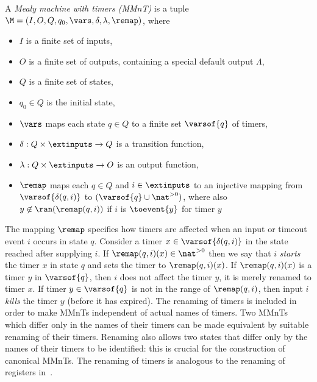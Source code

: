 \begin{definition}
\label{def:MMnT}
A \emph{Mealy machine with timers (MMnT)} is a tuple
\\
$\M = (I, O, Q, q_0, \vars, \delta, \lambda, \remap)$, where
\begin{itemize}
\item
  $I$ is a finite set of inputs,
\item
$O$ is a finite set of outputs, containing a special default output $\Lambda$,
\item
$Q$ is a finite set of states,
\item
$q_0 \in Q$ is the initial state,
\item
  $\vars$ maps each state $q \in Q$ to a finite set
$\varsof{q}$ of timers,
\item
$\delta: Q \times \extinputs \rightarrow Q$ is a transition function, 
\item
$\lambda: Q \times \extinputs \rightarrow O$ is an output function, 
\item
  $\remap$ maps each $q \in Q$ and $i \in \extinputs$ to an injective mapping from
  $\varsof{\delta(q,i)}$ to $(\varsof{q} \cup \nat^{>0})$, where also
  $y \not\in \ran(\remap(q,i))$ if $i$ is $\toevent{y}$ for timer $y$
\end{itemize}
\end{definition}
The mapping $\remap$ specifies how timers are affected when an input or timeout event $i$ occurs in state $q$.
Consider a timer $x \in \varsof{\delta(q,i)}$ in the state reached after
supplying $i$.
If $\remap(q,i)(x) \in\nat^{>0}$ then we say that $i$ \emph{starts} the timer $x$ in state $q$ and sets the timer to $\remap(q,i)(x)$.
If $\remap(q,i)(x)$ is a timer $y$ in $\varsof{q}$, then $i$ does not
affect the timer $y$, it is merely renamed to timer $x$.
If timer $y \in \varsof{q}$ is not in the range of $\remap(q,i)$, then
input $i$ \emph{kills} the timer $y$ (before it has expired).
The renaming of timers is included in order to make MMnTs independent of
actual names of timers. Two MMnTs which differ only in the names
of their timers can be made equivalent by suitable renaming of their
timers. Renaming also allows two states that differ only by the names
of their timers to be identified: this is crucial for the construction of
canonical MMnTs. The renaming of timers is analogous to the renaming of
registers in~\cite{CasselHJS16}.



